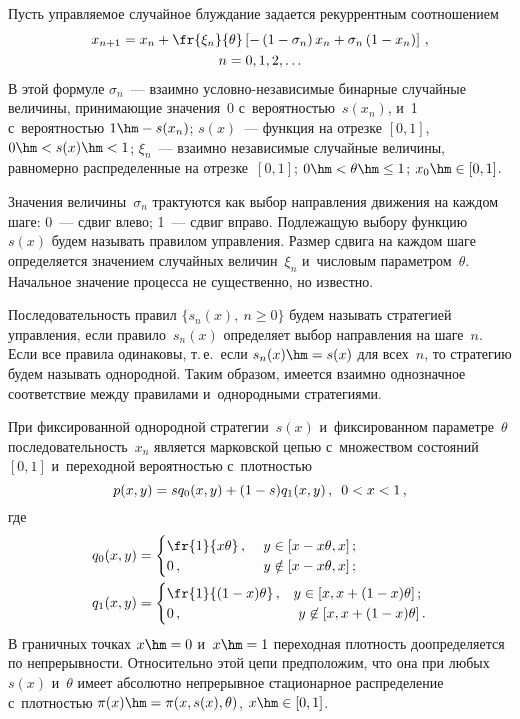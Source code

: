 \begin{multicols}{2}
  Пусть управляемое случайное блуж\-да\-ние задается рекуррентным 
соотношением
  \begin{multline*}
  x_{n+1}=x_n+\fr{\xi_n}{\theta}\left[ -\left( 1-\sigma_n\right) x_n +\sigma_n 
\left( 1-x_n\right)\right]\,,\\
  n=0,1,2,\ldots
\end{multline*}
    В этой формуле $\sigma_n$~--- взаимно услов\-но-не\-за\-ви\-си\-мые 
бинарные случайные величины, принимающие значения~0 
с~вероятностью~$s(x_n)$, и~1 с~вероятностью $1\hm- s(x_n)$; $s(x)$~--- 
функция на отрезке $[0,1]$, $0\hm< s(x)\hm<1$; $\xi_n$~---  взаимно 
независимые случайные величины, равномерно распределенные на 
отрезке~$[0, 1]$; $0\hm< \theta\hm\leq 1$; $x_0\hm\in 
[0,1]$.
  
  Значения величины~$\sigma_n$ трактуются как выбор на\-прав\-ле\-ния 
движения на каждом шаге: 0~--- сдвиг влево; 1~--- сдвиг вправо. 
Подлежащую выбору функцию~$s(x)$ будем называть правилом управ\-ле\-ния. 
Размер сдвига на каждом шаге определяется значением случайных 
величин~$\xi_n$ и~чис\-ло\-вым па\-ра\-мет\-ром~$\theta$. Начальное значение 
процесса не существенно, но известно.
  
  Последовательность правил $\{ s_n(x),\ n\geq 0\}$ будем называть 
стратегией управ\-ле\-ния, если правило~$s_n(x)$ определяет выбор 
направления на шаге~$n$. Если все правила одинаковы, т.\,е.\ если 
$s_n(x)\hm= s(x)$ для всех~$n$, то стратегию будем называть однородной. 
Таким образом, имеется взаимно однозначное соответствие меж\-ду 
правилами и~однородными стратегиями.
  
  При фиксированной однородной стратегии~$s(x)$ и~фиксированном 
па\-ра\-мет\-ре~$\theta$ по\-сле\-до\-ва\-тель\-ность~$x_n$ является марковской цепью 
с~множеством со\-сто\-яний~$[0,1]$ и~переходной ве\-ро\-ят\-ностью с~плот\-ностью
  \begin{equation}
  p(x,y) =sq_0(x,y)+(1-s)q_1(x,y)\,,\enskip 0<x<1\,,
  \label{e1-kr}
  \end{equation}
где
\begin{align*}
q_0(x,y) &= \begin{cases}
\fr{1}{x\theta}\,, &\ y\in [x-x\theta, x]\,;\\
0\,, &\  y\notin [x-x\theta,x]\,;
\end{cases}\\
q_1(x,y)&= \begin{cases}
\fr{1}{(1-x)\theta}\,, & y\in [x,x+(1-x)\theta]\,;\\
0\,, &\ y\not\in [x, x+(1-x)\theta]\,.
\end{cases}
\end{align*}
В граничных точках $x\hm=0$ и~$x\hm=1$ переходная плот\-ность 
доопределяется по не\-пре\-рыв\-ности. Относительно этой цепи предположим, 
что она при любых~$s(x)$ и~$\theta$ имеет абсолютно непрерывное 
стационарное распределение с~плот\-ностью $\pi(x)\hm= \pi(x,s(x),\theta)$, 
$x\hm\in [0,1]$.


\end{multicols}
